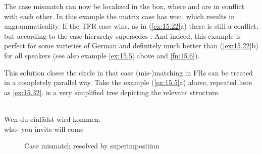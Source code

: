 \documentclass[output=paper]{langsci/langscibook}
\begin{document}
\begin{refcontext}
The case mismatch can now be localized in the box, where \Nom{} and \Acc{} are
in conflict with each other. In this example the matrix case \Nom{} has won,
which results in ungrammaticality. If the \gls{TFR} case \Acc{} wins, as in
(\ref{ex:15.22}a) there is still a conflict, but according to the case
hierarchy \Acc{} supersedes \Nom{}. And indeed, this example is perfect for
some varieties of German and definitely much better than (\ref{ex:15.22}b)
for all speakers (see also example \eqref{ex:15.5} above and
\cref{fn:15.6}).

This solution closes the circle in that case (mis-)matching in \glspl{FR} can
be treated in a completely parallel way. Take the example (\ref{ex:15.5}a)
above, repeated here as \eqref{ex:15.32}.  is a very
simplified tree depicting the relevant structure.\largerpage[2]

\ea\label{ex:15.32}\\
    \gll    Wen\tss{\Acc{}}     du  einlädst\textsuperscript{\Acc{}} wird kommen\textsuperscript{\Nom{}}.\\
            who-\Acc{} you invite          will   come\\
    \glt
\z

\begin{figure}[H]
    \caption{\label{fig:ex:15.33}Case mismatch resolved by superimposition}
\end{figure}
\end{refcontext}
\end{document}
